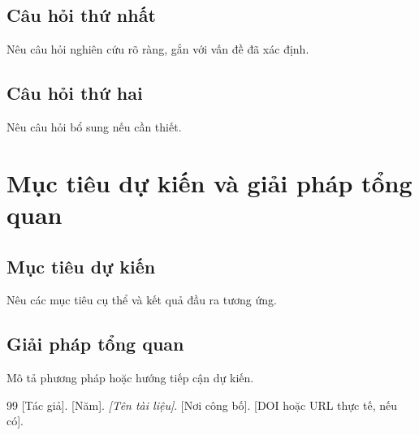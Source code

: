 \documentclass[a4paper,12pt]{article}
\begin{document}
\subsection{Câu hỏi thứ nhất}
Nêu câu hỏi nghiên cứu rõ ràng, gắn với vấn đề đã xác định.
\subsection{Câu hỏi thứ hai}
Nêu câu hỏi bổ sung nếu cần thiết.

\section{Mục tiêu dự kiến và giải pháp tổng quan}
\subsection{Mục tiêu dự kiến}
Nêu các mục tiêu cụ thể và kết quả đầu ra tương ứng.
\subsection{Giải pháp tổng quan}
Mô tả phương pháp hoặc hướng tiếp cận dự kiến.

\clearpage
{}
{}
\begin{thebibliography}{99}
[Tác giả]. [Năm]. \textit{[Tên tài liệu]}. [Nơi công bố].
[DOI hoặc URL thực tế, nếu có].
\end{thebibliography}
\end{document}
